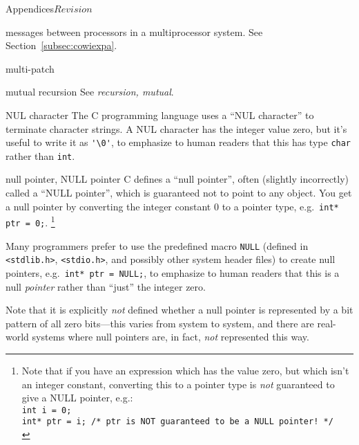 \begin{cactuspart}{Appendices}{}{$Revision$}
\begin{Lentry}
  messages between processors in a multiprocessor system.
  See Section~\ref{subsec:cowiexpa}.
\item[multi-patch]
\item[mutual recursion]
  See \textit{recursion, mutual}.
\item[NUL character]
  The C programming language uses a ``NUL character'' to terminate
  character strings.  A NUL character has the integer value zero, but
  it's useful to write it as \verb|'\0'|, to emphasize to human readers
  that this has type \verb|char| rather than \verb|int|.
\item[null pointer, NULL pointer]
  C defines a ``null pointer'', often (slightly incorrectly) called
  a ``NULL pointer'', which is guaranteed not to point to any object.
  You get a null pointer by converting the integer constant 0 to a
  pointer type, e.g.\ \verb|int* ptr = 0;|.%
\footnote{%
       Note that if you have an expression which
       has the value zero, but which isn't an
       integer constant, converting this to a
       pointer type is \emph{not} guaranteed to
       give a NULL pointer, e.g.:\\
       {\tt int i = 0;}\\
       {\tt int* ptr = i;     /* ptr is NOT guaranteed to be a NULL pointer! */}\\
       }%

  Many programmers prefer to use the predefined macro \verb|NULL|
  (defined in \verb|<stdlib.h>|, \verb|<stdio.h>|, and possibly other
  system header files) to create null pointers,
  e.g.\ \verb|int* ptr = NULL;|, to emphasize to human readers that
  this is a null \emph{pointer} rather than ``just'' the integer zero.

  Note that it is explicitly \emph{not} defined whether a null pointer
  is represented by a bit pattern of all zero bits---this varies from
  system to system, and there are real-world systems where null pointers
  are, in fact, \emph{not} represented this way.


\end{Lentry}
\end{cactuspart}
